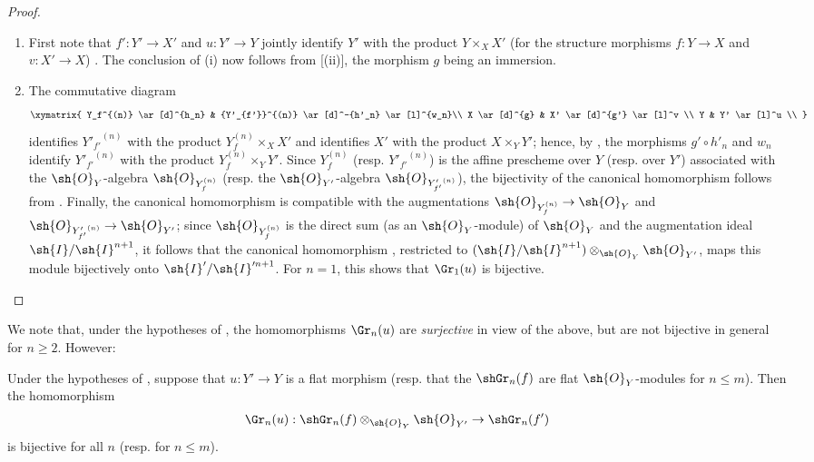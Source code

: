 \begin{proof}
\medskip\noindent
\begin{enumerate}
  \item[(i)] First note that $f':Y'\to X'$ and $u:Y'\to Y$ jointly identify $Y'$ with the product $Y\times_X X'$ (for the structure morphisms $f:Y\to X$ and $v:X'\to X$) .
  The conclusion of (i) now follows from [(ii)], the morphism $g$ being an immersion.
  \item[(ii)] The commutative diagram
  \[
  \xymatrix{
    Y_f^{(n)} \ar[d]^{h_n}  & {Y'_{f'}}^{(n)} \ar[d]^-{h'_n} \ar[l]^{w_n}\\  
    X         \ar[d]^{g}    & X'              \ar[d]^{g'} \ar[l]^v \\  
    Y                       & Y' \ar[l]^u \\  
  }
  \]
  identifies ${Y'_{f'}}^{(n)}$ with the product $Y_f^{(n)}\times_X X'$ and identifies $X'$ with the product $X\times_Y Y'$; hence, by , the morphisms $g'\circ h'_n$ and $w_n$ identify ${Y'_{f'}}^{(n)}$ with the product $Y_f^{(n)}\times_Y Y'$.
  Since $Y_f^{(n)}$ (resp. ${Y'_{f'}}^{(n)}$) is the affine prescheme over $Y$ (resp. over $Y'$) associated with the $\sh{O}_Y$-algebra $\sh{O}_{Y_f^{(n)}}$ (resp. the $\sh{O}_{Y'}$-algebra $\sh{O}_{{Y'_{f'}}^{(n)}}$), the bijectivity of the canonical homomorphism  follows from .
  Finally, the canonical homomorphism  is compatible with the augmentations $\sh{O}_{Y_f^{(n)}} \to \sh{O}_Y$ and $\sh{O}_{{Y'_{f'}}^{(n)}} \to \sh{O}_{Y'}$;
  since $\sh{O}_{Y_f^{(n)}}$ is the direct sum (as an $\sh{O}_Y$-module) of $\sh{O}_Y$ and the augmentation ideal $\sh{I}/\sh{I}^{n+1}$, it follows that the canonical homomorphism , restricted to $(\sh{I}/\sh{I}^{n+1})\otimes_{\sh{O}_Y}\sh{O}_{Y'}$, maps this module bijectively onto $\sh{I}'/\sh{I}'^{n+1}$. For $n=1$, this shows that $\Gr_1(u)$ is bijective.
\end{enumerate}
\end{proof}

We note that, under the hypotheses of , the homomorphisms $\Gr_n(u)$ are \emph{surjective} in view of the above, but are not bijective in general for $n \geq 2$.
However:

\begin{corollary}[16.2.4]
\label{IV.16.2.4}
Under the hypotheses of , suppose that $u: Y' \to Y$ is a flat morphism (resp. that the $\shGr_n(f)$ are flat $\sh{O}_Y$-modules for $n \leq m$).
Then the homomorphism 
\[
  \Gr_n(u):\shGr_n(f) \otimes_{\sh{O}_Y}\sh{O}_{Y'} \to \shGr_n(f')
\]
is bijective for all $n$ (resp. for $n \leq m$).
\end{corollary}

